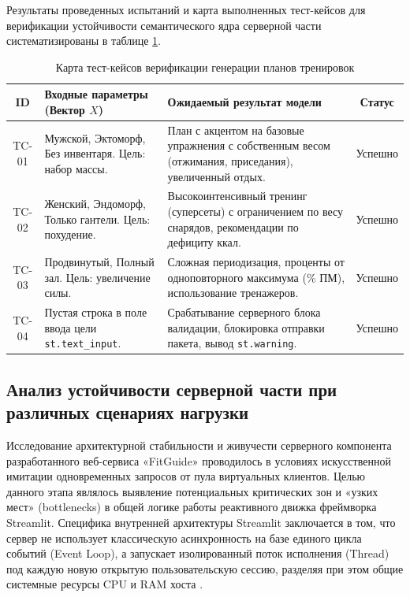 \documentclass[14pt, a4paper]{extarticle}
\begin{document}
Результаты проведенных испытаний и карта выполненных тест-кейсов для верификации устойчивости семантического ядра серверной части систематизированы в таблице \ref{tab:test_cases}.
\begin{table}[H]
\caption{Карта тест-кейсов верификации генерации планов тренировок}
\label{tab:test_cases}
\begin{center}
\begin{tabular}{|c|p{4cm}|p{4.5cm}|c|}
\hline
\textbf{ID} & \textbf{Входные параметры (Вектор $X$)} & \textbf{Ожидаемый результат модели} & \textbf{Статус} \\ \hline
TC-01 & Мужской, Эктоморф, Без инвентаря. Цель: набор массы. & План с акцентом на базовые упражнения с собственным весом (отжимания, приседания), увеличенный отдых. & Успешно \\ \hline
TC-02 & Женский, Эндоморф, Только гантели. Цель: похудение. & Высокоинтенсивный тренинг (суперсеты) с ограничением по весу снарядов, рекомендации по дефициту ккал. & Успешно \\ \hline
TC-03 & Продвинутый, Полный зал. Цель: увеличение силы. & Сложная периодизация, проценты от одноповторного максимума (\% ПМ), использование тренажеров. & Успешно \\ \hline
TC-04 & Пустая строка в поле ввода цели \texttt{st.text\_input}. & Срабатывание серверного блока валидации, блокировка отправки пакета, вывод \texttt{st.warning}. & Успешно \\ \hline
\end{tabular}
\end{center}
\end{table}




\subsection{Анализ устойчивости серверной части при различных сценариях нагрузки}

Исследование архитектурной стабильности и живучести серверного компонента разработанного веб-сервиса «FitGuide» проводилось в условиях искусственной имитации одновременных запросов от пула виртуальных клиентов. Целью данного этапа являлось выявление потенциальных критических зон и «узких мест» (bottlenecks) в общей логике работы реактивного движка фреймворка Streamlit. Специфика внутренней архитектуры Streamlit заключается в том, что сервер не использует классическую асинхронность на базе единого цикла событий (Event Loop), а запускает изолированный поток исполнения (Thread) под каждую новую открытую пользовательскую сессию, разделяя при этом общие системные ресурсы CPU и RAM хоста \cite{app.py}.
\end{document}
